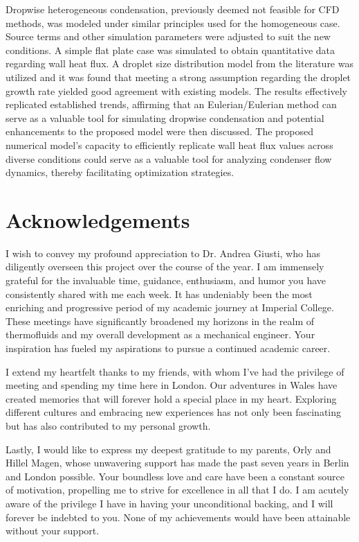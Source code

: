 \documentclass[12pt]{article}
\numberwithin{equation}{section}
\begin{document}
Dropwise heterogeneous condensation, previously deemed not feasible for CFD methods, was modeled under similar principles used for the homogeneous case. Source terms and other simulation parameters were adjusted to suit the new conditions. A simple flat plate case was simulated to obtain quantitative data regarding wall heat flux. A droplet size distribution model from the literature was utilized and it was found that meeting a strong assumption regarding the droplet growth rate yielded good agreement with existing models. The results effectively replicated established trends, affirming that an Eulerian/Eulerian method can serve as a valuable tool for simulating dropwise condensation and potential enhancements to the proposed model were then discussed. The proposed numerical model's capacity to efficiently replicate wall heat flux values across diverse conditions could serve as a valuable tool for analyzing condenser flow dynamics, thereby facilitating optimization strategies.


\newpage
{}
\section*{Acknowledgements}
I wish to convey my profound appreciation to Dr. Andrea Giusti, who has diligently overseen this project over the course of the year. I am immensely grateful for the invaluable time, guidance, enthusiasm, and humor you have consistently shared with me each week. It has undeniably been the most enriching and progressive period of my academic journey at Imperial College. These meetings have significantly broadened my horizons in the realm of thermofluids and my overall development as a mechanical engineer. Your inspiration has fueled my aspirations to pursue a continued academic career.

I extend my heartfelt thanks to my friends, with whom I've had the privilege of meeting and spending my time here in London. Our adventures in Wales have created memories that will forever hold a special place in my heart. Exploring different cultures and embracing new experiences has not only been fascinating but has also contributed to my personal growth.

Lastly, I would like to express my deepest gratitude to my parents, Orly and Hillel Magen, whose unwavering support has made the past seven years in Berlin and London possible. Your boundless love and care have been a constant source of motivation, propelling me to strive for excellence in all that I do. I am acutely aware of the privilege I have in having your unconditional backing, and I will forever be indebted to you. None of my achievements would have been attainable without your support.
\end{document}
